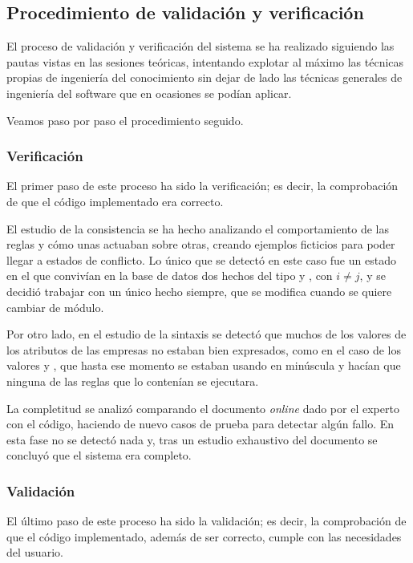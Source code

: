 \documentclass[a4paper, 11pt, titlepage]{article}
\begin{document}
    \subsection{Procedimiento de validación y verificación}

    El proceso de validación y verificación del sistema se ha realizado siguiendo las pautas vistas en las sesiones teóricas, intentando explotar al máximo las técnicas propias de ingeniería del conocimiento sin dejar de lado las técnicas generales de ingeniería del software que en ocasiones se podían aplicar.

    Veamos paso por paso el procedimiento seguido.

    \subsubsection*{Verificación}
    El primer paso de este proceso ha sido la verificación; es decir, la comprobación de que el código implementado era correcto.

    El estudio de la consistencia se ha hecho analizando el comportamiento de las reglas y cómo unas actuaban sobre otras, creando ejemplos ficticios para poder llegar a estados de conflicto. Lo único que se detectó en este caso fue un estado en el que convivían en la base de datos dos hechos del tipo  y , con $i \neq j$, y se decidió trabajar con un único hecho siempre, que se modifica cuando se quiere cambiar de módulo.

    Por otro lado, en el estudio de la sintaxis se detectó que muchos de los valores de los atributos de las empresas no estaban bien expresados, como en el caso de los valores  y , que hasta ese momento se estaban usando en minúscula y hacían que ninguna de las reglas que lo contenían se ejecutara.

    La completitud se analizó comparando el documento \emph{online} dado por el experto con el código, haciendo de nuevo casos de prueba para detectar algún fallo. En esta fase no se detectó nada y, tras un estudio exhaustivo del documento se concluyó que el sistema era completo.

    \subsubsection*{Validación}
    El último paso de este proceso ha sido la validación; es decir, la comprobación de que el código implementado, además de ser correcto, cumple con las necesidades del usuario.
\end{document}
